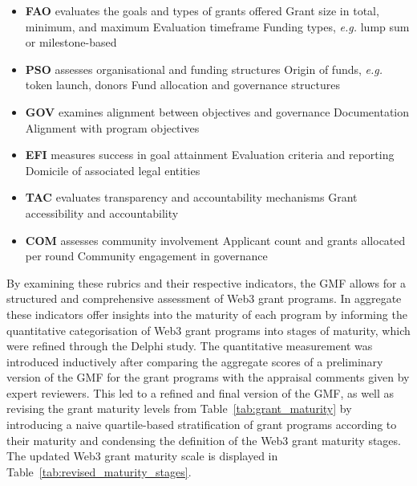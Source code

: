 \documentclass[conference]{IEEEtran}
\begin{document}
\footnotesize
\begin{itemize}
    \item \textbf{FAO} evaluates the goals and types of grants offered
        \subitem Grant size in total, minimum, and maximum
        \subitem Evaluation timeframe
        \subitem Funding types, \textit{e.g.} lump sum or milestone-based
    \item \textbf{PSO} assesses organisational and funding structures
        \subitem Origin of funds, \textit{e.g.} token launch, donors
        \subitem Fund allocation and governance structures
    \item \textbf{GOV} examines alignment between objectives and governance
        \subitem Documentation
        \subitem Alignment with program objectives
    \item \textbf{EFI} measures success in goal attainment
        \subitem Evaluation criteria and reporting
        \subitem Domicile of associated legal entities
    \item \textbf{TAC} evaluates transparency and accountability mechanisms
        \subitem Grant accessibility and accountability
    \item \textbf{COM} assesses community involvement
        \subitem Applicant count and grants allocated per round
        \subitem Community engagement in governance
\end{itemize}\vspace{7pt}
\normalsize

By examining these rubrics and their respective indicators, the GMF allows for a structured and comprehensive assessment of Web3 grant programs. In aggregate these indicators offer insights into the maturity of each program by informing the quantitative categorisation of Web3 grant programs into stages of maturity, which were refined through the Delphi study. The quantitative measurement was introduced inductively after comparing the aggregate scores of a preliminary version of the GMF for the grant programs with the appraisal comments given by expert reviewers. This led to a refined and final version of the GMF, as well as revising the grant maturity levels from Table~\ref{tab:grant_maturity} by introducing a naive quartile-based stratification of grant programs according to their maturity and condensing the definition of the Web3 grant maturity stages. The updated Web3 grant maturity scale is displayed in Table~\ref{tab:revised_maturity_stages}.
\end{document}
